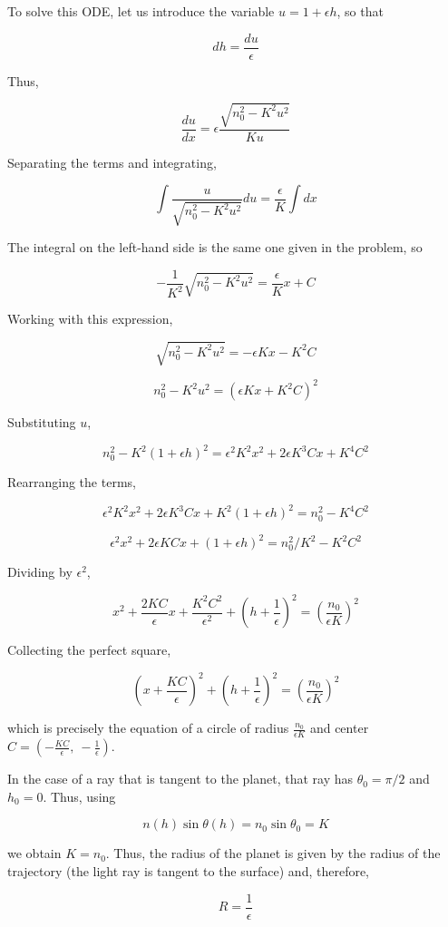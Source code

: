 \documentclass[11pt]{article}
\begin{document}
\begin{pproblem}
\begin{pssolution*}{}{}
\begin{alternativas}
        To solve this ODE, let us introduce the variable \(u = 1+\epsilon h\), so that

        \[dh = \frac{du}{\epsilon}\]

        Thus,

        \[\frac{du}{dx} = \epsilon\frac{\sqrt{n_0^2 - K^2u^2}}{Ku}\]

        Separating the terms and integrating,

        \[\int \frac{u}{\sqrt{n_0^2 - K^2u^2}} du = \frac{\epsilon}{K}\int dx\]
    
        The integral on the left-hand side is the same one given in the problem, so

        \[-\frac{1}{K^2}\sqrt{n_0^2-K^2u^2} = \frac{\epsilon}{K}x + C\]

        Working with this expression,

        \[\sqrt{n_0^2-K^2u^2} = -\epsilon K x - K^2C\]

        \[n_0^2-K^2u^2 = (\epsilon K x + K^2C)^2\]

        Substituting \(u\),

        \[n_0^2-K^2(1+\epsilon h)^2 = \epsilon^2K^2x^2 + 2\epsilon K^3 C x + K^4C^2\]

        Rearranging the terms,

        \[\epsilon^2K^2x^2 + 2\epsilon K^3 C x + K^2(1+\epsilon h)^2 = n_0^2 - K^4C^2 \]

        \[\epsilon^2x^2 + 2\epsilon K C x + (1+\epsilon h)^2 = n_0^2/K^2 - K^2C^2 \]

        Dividing by \(\epsilon^2\),

        \[x^2 + \frac{2KC}{\epsilon}x + \frac{K^2C^2}{\epsilon^2} + \left(h+\frac{1}{\epsilon}\right)^2 = \left(\frac{n_0}{\epsilon K}\right)^2\]

        Collecting the perfect square,

        \[\boxed{\left(x + \frac{KC}{\epsilon}\right)^2+\left(h+\frac{1}{\epsilon}\right)^2 = \left(\frac{n_0}{\epsilon K}\right)^2}\]
   
        which is precisely the equation of a circle of radius \(\frac{n_0}{\epsilon K}\) and center \(C = (-\frac{KC}{\epsilon}, \ - \frac{1}{\epsilon})\).

        \item In the case of a ray that is tangent to the planet, that ray has \(\theta_0 = \pi/2\) and \(h_0=0\). Thus, using
        
        \[n(h)\sin\theta(h) = n_0\sin\theta_0 = K\]

        we obtain \(K = n_0\). Thus, the radius of the planet is given by the radius of the trajectory (the light ray is tangent to the surface) and, therefore,

        \[\boxed{R = \frac{1}{\epsilon}}\]
    \end{alternativas}
    
\end{pssolution*}
\end{pproblem}
\end{document}

